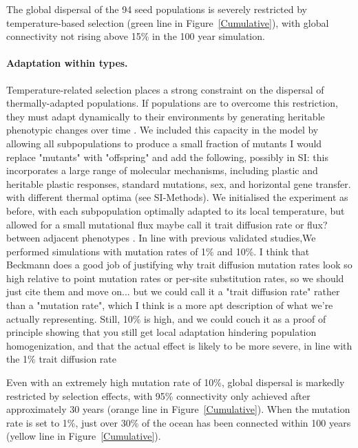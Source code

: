 \documentclass[12pt]{article}
\newcommand{\sinead}[1]{{\color{green} #1}}
\begin{document}
The global dispersal of the 94 seed populations is severely restricted by temperature-based selection (green line in Figure~\ref{Cumulative}), with global connectivity not rising above 15\% in the 100 year simulation. 

\paragraph{Adaptation within types.}

Temperature-related selection places a strong constraint on the dispersal of thermally-adapted populations. If populations are to overcome this restriction, they must adapt \sinead{dynamically} to their  environments \sinead{by generating heritable phenotypic changes over time} \citep{Thomas:2012,ODonnell:2018}. We included this capacity in the model by allowing all subpopulations to produce a small fraction of mutants \sinead{I would replace "mutants" with "offspring" and add the following, possibly in SI: this incorporates a large range of molecular mechanisms, including plastic and heritable plastic responses, standard mutations, sex, and horizontal gene transfer.} with different thermal optima (see SI-Methods). We initialised the experiment as before, with each subpopulation optimally adapted to its local temperature, but allowed for a small mutational flux \sinead{maybe call it trait diffusion rate or flux?} between adjacent phenotypes \citep{Sauterey:2017,Beckmann:2019}. \sinead{In line with previous validated studies,}We performed simulations with mutation rates of 1\% and 10\%. \sinead{I think that Beckmann does a good job of justifying why trait diffusion mutation rates look so high relative to point mutation rates or per-site substitution rates, so we should just cite them and move on... but we could call it a "trait diffusion rate" rather than a "mutation rate", which I think is a more apt description of what we're actually representing. Still, 10\% is high, and we could couch it as a proof of principle showing that you still get local adaptation hindering population homogenization, and that the actual effect is likely to be more severe, in line with the 1\% trait diffusion rate}

Even with an extremely high mutation rate of 10\%, global dispersal is markedly restricted by selection effects, with 95\% connectivity only achieved after approximately 30 years (orange line in Figure~\ref{Cumulative}). When the mutation rate is set to 1\%, just over 30\% of the ocean has been connected within 100 years (yellow line in Figure~\ref{Cumulative}). 
\end{document}

